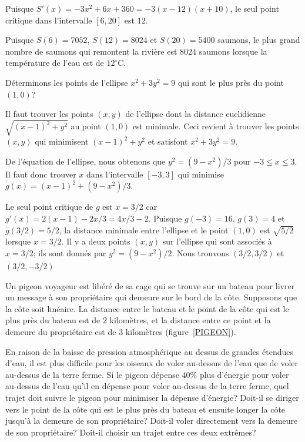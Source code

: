 {\begin{egg}
Puisque $S'(x) = -3x^2 + 6x + 360 = -3(x-12)(x+10)$, le seul
point critique dans l'intervalle $[6,20]$ est $12$.

Puisque $S(6) = 7052$, $S(12) = 8024$ et $S(20)=5400$ saumons, le plus
grand nombre de saumons qui remontent la rivière est $8024$ saumons
lorsque la température de l'eau est de $12^\circ$C.
\end{egg}

\begin{egg}
Déterminons les points de l'ellipse $x^2+3y^2=9$ qui sont le plus près
du point $(1,0)$?

Il faut trouver les points $(x,y)$ de l'ellipse dont la distance
euclidienne $\sqrt{(x-1)^2+y^2}$ au point $(1,0)$ est minimale.  Ceci
revient à trouver les points $(x,y)$ qui minimisent $(x-1)^2 + y^2$ et
satisfont $x^2+3y^2=9$.

De l'équation de l'ellipse, nous obtenons que $y^2 = (9-x^2)/3$ pour
$-3 \leq x \leq 3$.  Il faut donc trouver $x$ dans l'intervalle
$[-3, 3]$ qui minimise $g(x) = (x-1)^2 + (9-x^2)/3$.

Le seul point critique de $g$ est $x=3/2$ car
$g'(x) = 2(x-1) - 2x/3 = 4x/3 - 2$.  Puisque $g(-3) = 16$, $g(3)=4$ et
$g(3/2) = 5/2$, la distance minimale entre l'ellipse et le point
$(1,0)$ est $\sqrt{5/2}$ lorsque $x=3/2$.  Il y a deux points $(x,y)$ sur
l'ellipse qui sont associés à $x=3/2$; ils sont donnés par
$y^2 = (9-x^2)/2$.   Nous trouvons $(3/2, 3/2)$ et $(3/2, -3/2)$ 
\end{egg}

\begin{egg}[\life]
Un pigeon voyageur est libéré de sa cage qui se trouve sur un bateau
pour livrer un message à son propriétaire qui demeure sur le bord de
la côte.  Supposons que la côte soit linéaire.  La distance entre le
bateau et le point de la côte qui est le plus près du bateau est de
$2$ kilomètres, et la distance entre ce point et la demeure du
propriétaire est de $3$ kilomètres (figure~\ref{PIGEON}).

En raison de la baisse de pression atmosphérique au dessus de grandes
étendues d'eau, il est plus difficile pour les oiseaux de voler
au-dessus de l'eau que de voler au-dessus de la terre ferme.  Si le
pigeon dépense $40$\% plus d'énergie pour voler au-dessus de l'eau
qu'il en dépense pour voler au-dessus de la terre ferme, quel trajet
doit suivre le pigeon pour minimiser la dépense d'énergie? Doit-il se
diriger vers le point de la côte qui est le plus près du bateau et
ensuite longer la côte jusqu'à la demeure de son propriétaire?
Doit-il voler directement vers la demeure de son propriétaire?
Doit-il choisir un trajet entre ces deux extrêmes?


\end{egg}}
